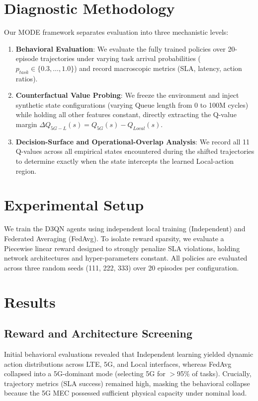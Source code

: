 \documentclass[conference]{IEEEtran}
\begin{document}
\section{Diagnostic Methodology}
Our MODE framework separates evaluation into three mechanistic levels:

\begin{enumerate}
    \item \textbf{Behavioral Evaluation}: We evaluate the fully trained policies over 20-episode trajectories under varying task arrival probabilities ($p_{task} \in \{0.3, \dots, 1.0\}$) and record macroscopic metrics (SLA, latency, action ratios).
    \item \textbf{Counterfactual Value Probing}: We freeze the environment and inject synthetic state configurations (varying Queue length from 0 to 100M cycles) while holding all other features constant, directly extracting the Q-value margin $\Delta Q_{5G-L}(s) = Q_{5G}(s) - Q_{Local}(s)$.
    \item \textbf{Decision-Surface and Operational-Overlap Analysis}: We record all 11 Q-values across all empirical states encountered during the shifted trajectories to determine exactly when the state intercepts the learned Local-action region.
\end{enumerate}

\section{Experimental Setup}
We train the D3QN agents using independent local training (Independent) and Federated Averaging (FedAvg). To isolate reward sparsity, we evaluate a Piecewise linear reward designed to strongly penalize SLA violations, holding network architectures and hyper-parameters constant. All policies are evaluated across three random seeds (111, 222, 333) over 20 episodes per configuration.

\section{Results}

\subsection{Reward and Architecture Screening}
Initial behavioral evaluations revealed that Independent learning yielded dynamic action distributions across LTE, 5G, and Local interfaces, whereas FedAvg collapsed into a 5G-dominant mode (selecting 5G for $>$95\% of tasks). Crucially, trajectory metrics (SLA success) remained high, masking the behavioral collapse because the 5G MEC possessed sufficient physical capacity under nominal load. 
\end{document}
